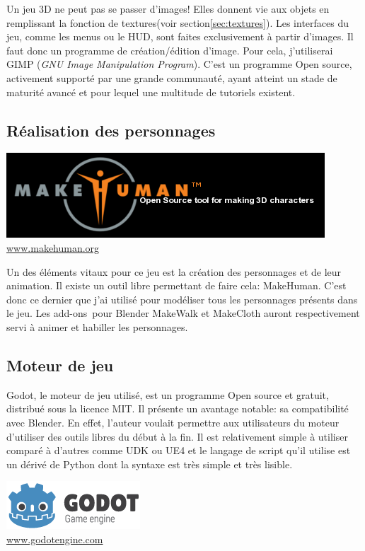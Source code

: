 Un jeu 3D ne peut pas se passer d'images! Elles donnent vie aux objets en remplissant la fonction de textures (voir section\ref{sec:textures}). Les interfaces du jeu, comme les menus ou le HUD, sont faites exclusivement à partir d'images. Il faut donc un programme de création/édition d'image. Pour cela, j'utiliserai GIMP (\textit{GNU Image Manipulation Program}). C'est un programme Open source, activement supporté par une grande communauté, ayant atteint un stade de maturité avancé et pour lequel une multitude de tutoriels existent.



\subsection{Réalisation des personnages}
\begin{center}
	\includegraphics[width=.5\textwidth]{images/Technique/makeHuman.png}
	\\\url{www.makehuman.org}
\end{center}

Un des éléments vitaux pour ce jeu est la création des personnages et de leur animation. Il existe un outil libre permettant de faire cela: MakeHuman. C'est donc ce dernier que j'ai utilisé pour modéliser tous les personnages présents dans le jeu. Les add-ons\ pour Blender MakeWalk et MakeCloth auront respectivement servi à animer et habiller les personnages.



\subsection{Moteur de jeu}
Godot, le moteur de jeu utilisé, est un programme Open source et gratuit, distribué sous la licence MIT. Il présente un avantage notable: sa compatibilité avec Blender. En effet, l'auteur voulait permettre aux utilisateurs du moteur d'utiliser des outils libres du début à la fin. Il est relativement simple à utiliser comparé à d'autres comme UDK ou UE4 et le langage de script qu'il utilise est un dérivé de Python dont la syntaxe est très simple et très lisible.

\begin{center}
	\includegraphics[width=.5\textwidth]{./images/Technique/godot_icone.png}
	\\[-1mm]\url{www.godotengine.com}
\end{center}

